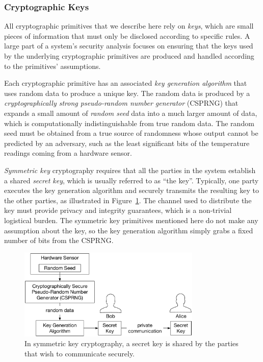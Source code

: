 \subsubsection{Cryptographic Keys}

All cryptographic primitives that we describe here rely on \textit{keys}, which
are small pieces of information that must only be disclosed according to
specific rules. A large part of a system's security analysis focuses on
ensuring that the keys used by the underlying cryptographic primitives are
produced and handled according to the primitives' assumptions.

Each cryptographic primitive has an associated \textit{key generation
algorithm} that uses random data to produce a unique key. The random data is
produced by a \textit{cryptographically strong pseudo-random number generator}
(CSPRNG) that expands a small amount of \textit{random seed} data into a much
larger amount of data, which is computationally indistinguishable from true
random data. The random seed must be obtained from a true source of randomness
whose output cannot be predicted by an adversary, such as the least significant
bits of the temperature readings coming from a hardware sensor.

\textit{Symmetric key} cryptography requires that all the parties in the system
establish a shared \textit{secret key}, which is usually referred to as ``the
key''. Typically, one party executes the key generation algorithm and securely
transmits the resulting key to the other parties, as illustrated in
Figure~\ref{fig:symmetric_key_generation}. The channel used to
distribute the key must provide privacy and integrity guarantees, which is a
non-trivial logistical burden. The symmetric key primitives mentioned here do
not make any assumption about the key, so the key generation algorithm simply
grabs a fixed number of bits from the CSPRNG.

\begin{figure}[hbt]
  \centering
  \includegraphics[width=87mm]{figures/symmetric_key_generation.pdf}
  \caption{
    In symmetric key cryptography, a secret key is shared by the parties that
    wish to communicate securely.
  }
  \label{fig:symmetric_key_generation}
\end{figure}


